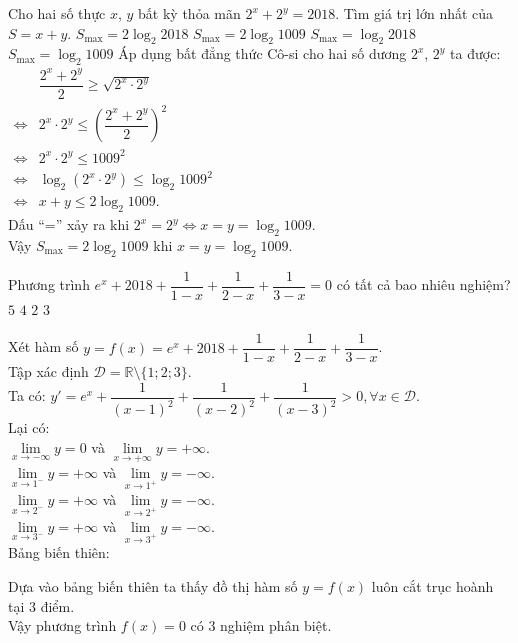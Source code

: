 \begin{ex}%
 Cho hai số thực $x$, $y$ bất kỳ thỏa mãn $2^x + 2^y = 2018$. Tìm giá trị lớn nhất của $S = x + y$.
 \choice
  {$S_{\max} = 2 \log_2 2018$}
  {\True $S_{\max} = 2 \log_2 1009$}
  {$S_{\max} = \log_2 2018$}
  {$S_{\max} = \log_2 1009$}
 \loigiai
  {
  Áp dụng bất đẳng thức Cô-si cho hai số dương $2^x$, $2^y$ ta được:\\
  $\begin{array}{ll}
  				   & \dfrac{2^x + 2^y}{2} \geq \sqrt{2^x \cdot 2^y}\\
   \Leftrightarrow & 2^x \cdot 2^y \leq \left( \dfrac{2^x + 2^y}{2} \right)^2\\
   \Leftrightarrow & 2^x \cdot 2^y \leq 1009^2\\
   \Leftrightarrow & \log_2 (2^x \cdot 2^y) \leq \log_2 1009^2\\
   \Leftrightarrow & x + y \leq 2 \log_2 1009.
   \end{array}$\\
   Dấu ``='' xảy ra khi $2^x = 2^y \Leftrightarrow x = y = \log_2 1009$.\\
   Vậy $S_{\max} = 2 \log_2 1009$ khi $x = y = \log_2 1009$.
  }
\end{ex}


\begin{ex}%
 Phương trình $e^x + 2018 + \dfrac{1}{1-x} + \dfrac{1}{2-x} + \dfrac{1}{3-x} = 0$ có tất cả bao nhiêu nghiệm?
 \choice
  {$5$}
  {$4$}
  {$2$}
  {\True $3$}
 \loigiai
  {
  Xét hàm số $y = f(x)=e^x + 2018 + \dfrac{1}{1-x} + \dfrac{1}{2-x} + \dfrac{1}{3-x}$.\\
  Tập xác định $\mathscr{D} = \mathbb{R} \setminus \{1;2;3\}$.\\
  Ta có: $y' = e^x + \dfrac{1}{(x-1)^2} + \dfrac{1}{(x-2)^2} + \dfrac{1}{(x-3)^2} > 0, \forall x \in \mathscr{D}$.\\
  Lại có:\\
  $\lim\limits_{x \to -\infty} y = 0$ và $\lim\limits_{x \to +\infty} y = +\infty$.\\
  $\lim\limits_{x \to 1^-} y = +\infty$ và $\lim\limits_{x \to 1^+} y = -\infty$.\\
  $\lim\limits_{x \to 2^-} y = +\infty$ và $\lim\limits_{x \to 2^+} y = -\infty$.\\
  $\lim\limits_{x \to 3^-} y = +\infty$ và $\lim\limits_{x \to 3^+} y = -\infty$.\\
  Bảng biến thiên:
  \begin{center}
  \end{center}
  Dựa vào bảng biến thiên ta thấy đồ thị hàm số $y = f(x)$ luôn cắt trục hoành tại $3$ điểm.\\
  Vậy phương trình $f(x) = 0$ có 3 nghiệm phân biệt.
  }
\end{ex}


